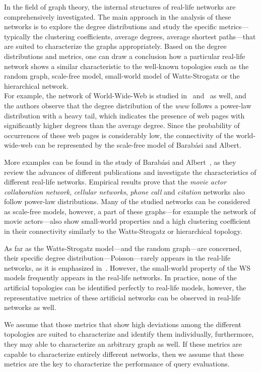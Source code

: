 In the field of graph theory, the internal structures of real-life networks are comprehensively investigated. The main approach in the analysis of these networks is to explore the degree distributions and study the specific metrics---typically the clustering coefficients, average degrees, average shortest paths---that are suited to characterize the graphs appropriately. Based on the degree distributions and metrics, one can draw a conclusion how a particular real-life network shows a similar characteristic to the well-known topologies such as the random graph, scale-free model, small-world model of Watts-Strogatz or the hierarchical network.\\
For example, the network of World-Wide-Web is studied in~\cite{www1} and~\cite{www2} as well, and the authors observe that the degree distribution of the \textit{www} follows a power-law distribution with a heavy tail, which indicates the presence of web pages with significantly higher degrees than the average degree. Since the probability of occurrences of these web pages is considerably low, the connectivity of the world-wide-web can be represented by the scale-free model of Barabási and Albert.

More examples can be found in the study of Barabási and Albert~\cite{statistical_mechanics}, as they review the advances of different publications and investigate the characteristics of different real-life networks. Empirical results prove that the \textit{movie actor collaboration network}, \textit{cellular networks}, \textit{phone call} and \textit{citation} networks also follow power-law distributions. Many of the studied networks can be considered as scale-free models, however, a part of these graphs---for example the network of movie actors---also show small-world properties and a high clustering coefficient in their connectivity similarly to the Watts-Strogatz or hierarchical topology.

As far as the Watts-Strogatz model---and the random graph---are concerned, their specific degree distribution---Poisson---rarely appears in the real-life networks, as it is emphasized in~\cite{random_study}. However, the small-world property of the WS models frequently appears in the real-life networks. In practice, none of the artificial topologies can be identified perfectly to real-life models, however, the representative metrics of these artificial networks can be observed in real-life networks as well. 

We assume that those metrics that show high deviations among the different topologies are suited to characterize and identify them individually, furthermore, they may able to characterize an arbitrary graph as well. If these metrics are capable to characterize entirely different networks, then we assume that these metrics are the key to characterize the performance of query evaluations.

